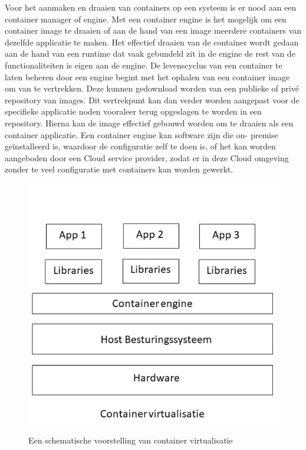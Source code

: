 Voor het aanmaken en draaien van containers op een systeem is er nood aan een container manager of engine. Met een container engine is het mogelijk om een container image te draaien of aan de hand van een image meerdere containers van dezelfde applicatie te maken. Het effectief draaien van de container wordt gedaan aan de hand van een runtime dat vaak gebundeld zit in de engine de rest van de functionaliteiten is eigen aan de engine. De levenscyclus van een container te laten beheren door een engine begint met het ophalen van een container image om van te vertrekken. Deze kunnen gedownload worden van een publieke of privé repository van images. Dit vertrekpunt kan dan verder worden aangepast voor de specifieke applicatie noden vooraleer terug opgeslagen te worden in een repository. Hierna kan de image effectief gebouwd worden om te draaien als een container applicatie. Een container engine kan software zijn die on- premise geïnstalleerd is, waardoor de configuratie zelf te doen is, of het kan worden aangeboden door een Cloud service provider, zodat er in deze Cloud omgeving zonder te veel configuratie met containers kan worden gewerkt\autocite{Casalicchio2020}.
\begin{figure}[h]
    \includegraphics[width=\linewidth]{img/container.jpg}
    \label{fig:Containers}
    \caption[Schema container virtualisatie]{Een schematische voorstelling van container virtualisatie}
    \centering
\end{figure}


